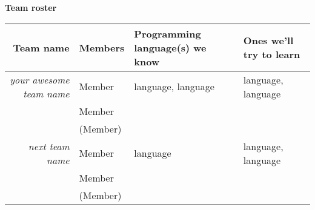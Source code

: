\documentclass[11pt]{amsart}
\begin{document}
\begin{center}
  \textbf{\sffamily Team roster}
\end{center}

\bigskip
\begin{center}
  \begin{tabular}[c]{r|l|l|l}
    Team name
    & Members
    & Programming language(s) we know
    & Ones we'll try to learn
    \\\hline
    \emph{your awesome team name}
    & Member
    & language, language & language, language  \\
    & Member \\
    & (Member)                
    \\\hline
    \emph{next team name}
    & Member
    & language  & language, language  \\
    & Member \\
    & (Member)                
    
  \end{tabular}
\end{center}
\end{document}
